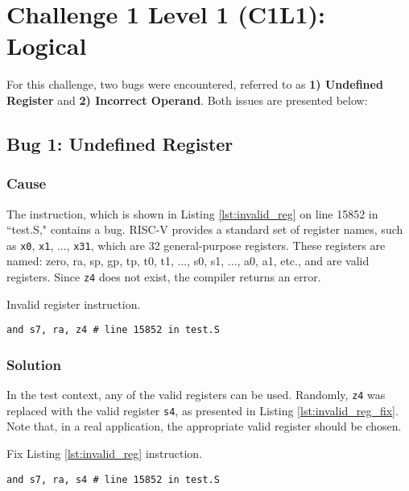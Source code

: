 \section{Challenge 1 Level 1 (C1L1): Logical}

For this challenge, two bugs were encountered, referred to as \textbf{1) Undefined Register} and \textbf{2) Incorrect Operand}. Both issues are presented below:

\subsection{Bug 1: Undefined Register}

\subsubsection{Cause}

The instruction, which is shown in Listing \ref{lst:invalid_reg} on line 15852 in ``test.S," contains a bug. RISC-V provides a standard set of 
register names, such as \texttt{x0}, \texttt{x1}, ..., \texttt{x31}, which are 32 general-purpose registers. These 
registers are named: zero, ra, sp, gp, tp, t0, t1, ..., s0, s1, ..., a0, a1, etc., and are valid registers. Since \texttt{z4} does not exist, the compiler returns an error.

\begin{listing}[h]
\caption{Invalid register instruction.}
\label{lst:invalid_reg}
\begin{verbatim}
and s7, ra, z4 # line 15852 in test.S
\end{verbatim}
\end{listing}

\subsubsection{Solution}

In the test context, any of the valid registers can be used. Randomly, \texttt{z4} was replaced with the valid register \texttt{s4}, as presented in Listing \ref{lst:invalid_reg_fix}. Note that, in a real application, the appropriate valid register should be chosen.

\begin{listing}[h]
\caption{Fix Listing \ref{lst:invalid_reg} instruction.}
\label{lst:invalid_reg_fix}
\begin{verbatim}
and s7, ra, s4 # line 15852 in test.S
\end{verbatim}
\end{listing}

